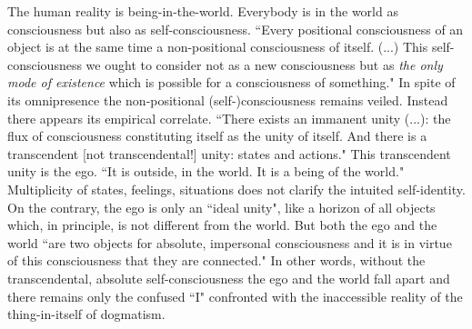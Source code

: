 The human reality is being-in-the-world. Everybody is in the world as consciousness but also as self-consciousness. ``Every positional consciousness of an object is at the same time a non-positional consciousness of 
itself. (...) This self-consciousness we ought to consider not as a new consciousness but as {\em the only mode of existence} which is possible for a consciousness of something." \cite{BN}   In spite of its omnipresence the non-positional 
(self-)consciousness remains veiled. Instead there appears its empirical correlate. ``There exists an immanent unity 
(...): the flux of consciousness constituting itself as the unity of itself. And there is a transcendent  [not 
transcendental!] unity: states and actions." \cite{ToE} This transcendent unity is the ego. ``It is outside, in the world. It is a 
being of the world." \cite{ToE} Multiplicity of states, feelings, situations does not clarify the intuited self-identity. On the 
contrary, the ego is only an ``ideal unity", like a horizon of all objects which, in principle, is not different from the 
world. But both the ego and the world ``are two objects for absolute, impersonal consciousness and it is in virtue of 
this consciousness that they are connected." \cite{ToE} In other words, without the transcendental, absolute self-consciousness the ego and the world fall apart and there remains only the confused ``I" confronted with 
the inaccessible reality of the thing-in-itself of dogmatism.

